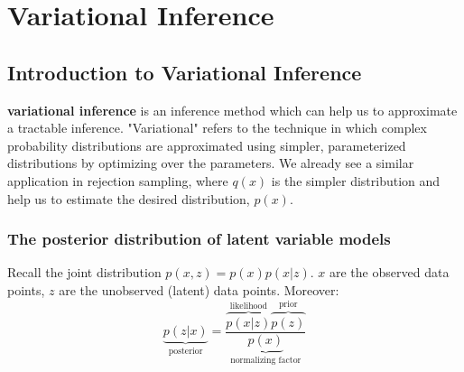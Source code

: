 \section{Variational Inference}
\subsection{Introduction to Variational Inference}
\textbf{variational inference} is an inference method which can help us to approximate a tractable inference. "Variational" refers to the technique in which complex probability distributions are approximated using simpler, parameterized distributions by optimizing over the parameters. We already see a similar application in rejection sampling, where $q(x)$ is the simpler distribution and help us to estimate the desired distribution, $p(x)$.
\subsubsection*{The posterior distribution of latent variable models}
Recall the joint distribution $p(x,z)=p(x)p(x|z)$. $x$ are the observed data points, $z$ are the unobserved (latent) data points. Moreover:
$$\underbrace{p(z|x)}_{\text{posterior}}=\frac{\overbrace{p(x|z)}^{\text{likelihood}}\overbrace{p(z)}^{\text{prior}}}{\underbrace{p(x)}_{\text{normalizing factor}}}$$
